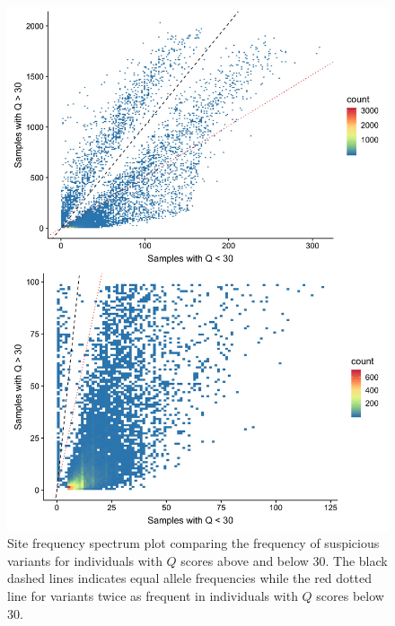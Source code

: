 \documentclass[9pt,lineno]{elife}
\begin{document}
\begin{figure}[h]
\centering
\includegraphics[width=15cm,keepaspectratio]{./Figures/OverUnder30.jpg}
\caption{Site frequency spectrum plot comparing the frequency of suspicious variants for individuals with $Q$ scores above and below 30. The black dashed lines indicates equal allele frequencies while the red dotted line for variants twice as frequent in individuals with $Q$ scores below 30.}  
\label{90HanSFS_full}
\end{figure}
\end{document}
